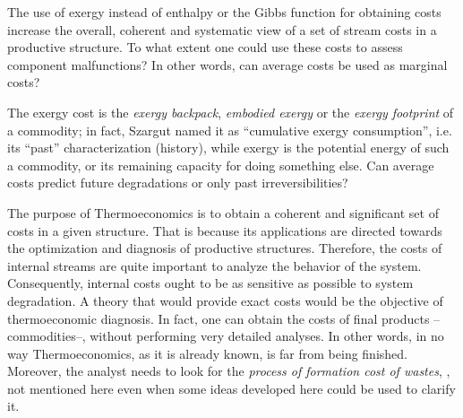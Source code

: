 \documentclass[energies,article,submit,moreauthors,pdftex]{Definitions/mdpi}
\begin{document}
The use of exergy instead of enthalpy or the Gibbs function for obtaining costs increase the overall, coherent and systematic view of a set of stream costs in a productive structure. To what extent one could use these costs to assess component malfunctions? In other words, can average costs be used as marginal costs?

The exergy cost is the \emph{exergy backpack}, \emph{embodied exergy} or the \emph{exergy footprint} of a commodity; in fact, Szargut named it as “cumulative exergy consumption”,\cite{Szargut1988} i.e. its “past” characterization (history), while exergy is the potential energy of such a commodity, or its remaining capacity for doing something else. Can average costs predict future degradations or only past irreversibilities?

The purpose of Thermoeconomics is to obtain a coherent and significant set of costs in a given structure. That is because its applications are directed towards the optimization and diagnosis of productive structures. Therefore, the costs of internal streams are quite important to analyze the behavior of the system. Consequently, internal costs ought to be as sensitive as possible to system degradation. A theory that would provide exact costs would be the objective of thermoeconomic diagnosis. In fact, one can obtain the costs of final products --commodities--, without performing very detailed analyses. In other words, in no way Thermoeconomics, as it is already known, is far from being finished. Moreover, the analyst needs to look for the \emph{process of formation cost of wastes}, \cite{Torres2008}, not mentioned here even when some ideas developed here could be used to clarify it.
\end{document}
